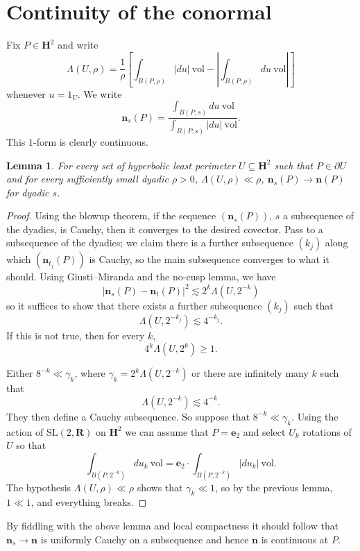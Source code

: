 \documentclass[reqno,12pt,letterpaper]{amsart}
\newcommand{\RR}{\mathbf{R}}
\newcommand{\Hyp}{\mathbf H}
\newcommand{\SL}{\mathrm{SL}}
\newcommand{\evect}{\mathbf e}
\newcommand{\normal}{\mathbf n}
\newcommand{\vol}{\mathrm{vol}}
\newtheorem{lemma}[theorem]{Lemma}
\theoremstyle{definition}
\numberwithin{equation}{section}
\begin{document}
\section{Continuity of the conormal}
Fix $P \in \Hyp^2$ and write
$$\Lambda(U, \rho) = \frac{1}{\rho}\left[\int_{B(P, \rho)} |du| ~\vol - \left|\int_{B(P, \rho)} du ~\vol\right|\right]$$
whenever $u = 1_U$.
We write
$$\normal_s(P) = \frac{\int_{B(P, s)} du ~\vol}{\int_{B(P, s)} |du| ~\vol}.$$
This $1$-form is clearly continuous.

\begin{lemma}
For every set of hyperbolic least perimeter $U \subseteq \Hyp^2$ such that $P \in \partial U$ and for every sufficiently small dyadic $\rho > 0$, $\Lambda(U, \rho) \ll \rho$, $\normal_s(P) \to \normal(P)$ for dyadic $s$.
\end{lemma}
\begin{proof}
Using the blowup theorem, if the sequence $(\normal_s(P))$, $s$ a subsequence of the dyadics, is Cauchy, then it converges to the desired covector.
Pass to a subsequence of the dyadics; we claim there is a further subsequence $(k_j)$ along which $(\normal_{t_j}(P))$ is Cauchy, so the main subsequence converges to what it should.
Using Giusti--Miranda and the no-cusp lemma, we have
$$|\normal_s(P) - \normal_t(P)|^2 \lesssim 2^k \Lambda(U, 2^{-k})$$
so it suffices to show that there exists a further subsequence $(k_j)$ such that
$$\Lambda(U, 2^{-k_j}) \lesssim 4^{-{k_j}}.$$
If this is not true, then for every $k$,
$$4^k \Lambda(U, 2^k) \geq 1.$$

Either $8^{-k} \ll \gamma_k$, where $\gamma_k = 2^k\Lambda(U, 2^{-k})$ or there are infinitely many $k$ such that
$$\Lambda(U, 2^{-k}) \lesssim 4^{-k}.$$
They then define a Cauchy subsequence. So suppose that $8^{-k} \ll \gamma_k$.
Using the action of $\SL(2, \RR)$ on $\Hyp^2$ we can assume that $P = \evect_2$ and select $U_k$ rotations of $U$ so that
$$\int_{B(P, 2^{-k})} du_k ~\vol = \evect_2 \cdot \int_{B(P, 2^{-k})} |du_k| ~\vol.$$
The hypothesis $\Lambda(U, \rho) \ll \rho$ shows that $\gamma_k \ll 1$, so by the previous lemma, $1 \ll 1$, and everything breaks.
\end{proof}

By fiddling with the above lemma and local compactness it should follow that $\normal_s \to \normal$ is uniformly Cauchy on a subsequence and hence $\normal$ is continuous at $P$.



\printbibliography
\end{document}
